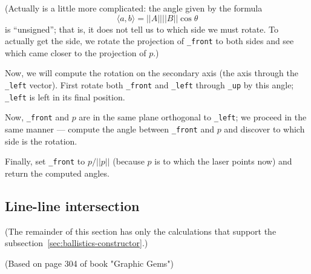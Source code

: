 \documentclass{article}
\newcommand\attribute[1]{\texttt{#1}}
\begin{document}
(Actually is a little more complicated:
the angle given by the formula
\begin{equation*}
    \langle a, b \rangle = ||A|| ||B|| \cos \theta
\end{equation*}
is ``unsigned''; that is,
it does not tell us to which side we must rotate.
To actually get the side,
we rotate the projection of \attribute{\_front} to both sides
and see which came closer to the projection of $p$.)

Now, we will compute the rotation on the secondary axis
(the axis through the \attribute{\_left} vector).
First rotate both \attribute{\_front} and \attribute{\_left}
through \attribute{\_up} by this angle;
\attribute{\_left} is left in its final position.

Now, \attribute{\_front} and $p$
are in the same plane orthogonal to \attribute{\_left};
we proceed in the same manner
--- compute the angle between \attribute{\_front} and $p$
and discover to which side is the rotation.

Finally, set \attribute{\_front} to $p / ||p||$
(because $p$ is to which the laser points now)
and return the computed angles.

\subsection{Line-line intersection}
\label{sec:line-line-intersection}

(The remainder of this section has only the calculations
that support the subsection~\ref{sec:ballistics-constructor}.)

(Based on page 304 of book "Graphic Gems")
\end{document}
